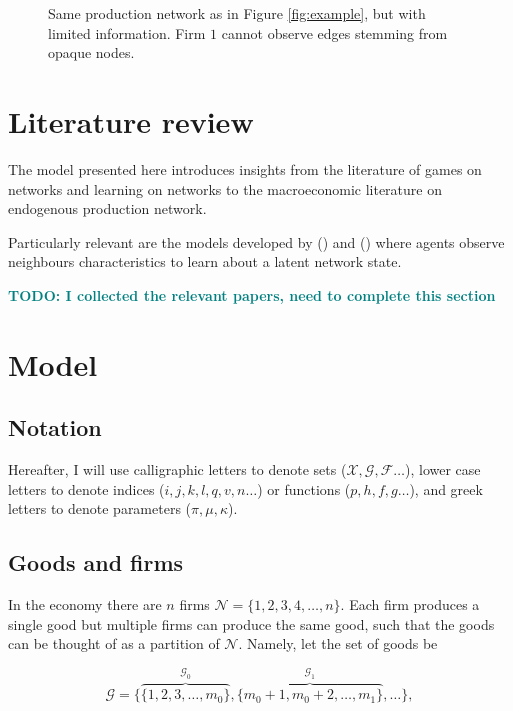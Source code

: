 \documentclass[american, abstract=on]{scrartcl}
\newcommand{\inputTikZ}[2]{%
      \scalebox{#1}{}  
    }
\newcommand{\F}{\mathcal{F}}
\newcommand{\X}{\mathcal{X}}
\newcommand{\G}{\mathcal{G}}
\newcommand{\N}{\mathcal{N}}
\newcommand{\citein}[1]{\citeauthor{#1} (\citeyear{#1})}
\newcommand\notes[1]{\textcolor{teal}{\textbf{#1}}}
\begin{document}
\begin{figure}[H]
  \centering
  \inputTikZ{0.5}{diagrams/example-limited.tikz} 
  \caption{Same production network as in Figure \ref{fig:example}, but with limited information. Firm $1$ cannot observe edges stemming from opaque nodes.}
  \label{fig:example:unknown}  
\end{figure}

\section{Literature review}

The model presented here introduces insights from the literature of games on networks and learning on networks to the macroeconomic literature on endogenous production network.

Particularly relevant are the models developed by \citein{dasaratha_bayesian_2018} and \citein{dasaratha_learning_2021} where agents observe neighbours characteristics to learn about a latent network state.   

\notes{TODO: I collected the relevant papers, need to complete this section}

\fi

\section{Model}

\subsection{Notation}

Hereafter, I will use calligraphic letters to denote sets ($\X, \G, \F \ldots$), lower case letters to denote indices ($i, j, k, l, q, v, n \ldots$) or functions ($p, h, f, g \ldots$), and greek letters to denote parameters ($\pi, \mu, \kappa$).

\subsection{Goods and firms}

In the economy there are $n$ firms $\N = \{1, 2, 3, 4, \ldots, n \}$. Each firm produces a single good but multiple firms can produce the same good, such that the goods can be thought of as a partition of $\N$. Namely, let the set of goods be

\begin{equation}
    \G = \{ \overbrace{\{1, 2, 3, \ldots, m_0\}}^{\G_0},  \overbrace{\{m_0 + 1, m_0 + 2, \ldots, m_1\}}^{\G_1}, \ldots \},
\end{equation}
\end{document}
